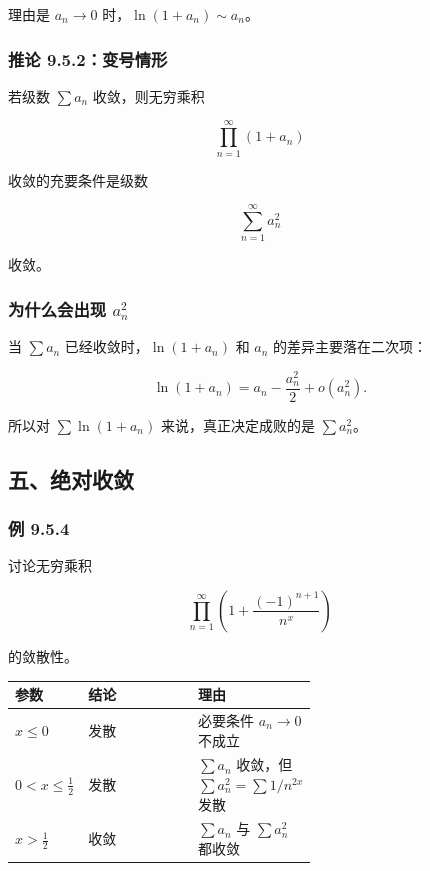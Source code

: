 理由是 \(a_n\to0\) 时，\(\ln(1+a_n)\sim a_n\)。

\subsubsection*{推论 9.5.2：变号情形}

若级数 \(\sum a_n\) 收敛，则无穷乘积

\[
      \prod_{n=1}^{\infty}(1+a_n)
    \]

收敛的充要条件是级数

\[
      \sum_{n=1}^{\infty}a_n^2
    \]

收敛。

\subsubsection*{为什么会出现 \(a_n^2\)}

当 \(\sum a_n\) 已经收敛时，\(\ln(1+a_n)\) 和 \(a_n\) 的差异主要落在二次项：

\[
      \ln(1+a_n)=a_n-\frac{a_n^2}{2}+o(a_n^2).
    \]

所以对 \(\sum \ln(1+a_n)\) 来说，真正决定成败的是 \(\sum a_n^2\)。

\subsection*{五、绝对收敛}

\subsubsection*{例 9.5.4}

讨论无穷乘积

\[
      \prod_{n=1}^{\infty}\left(1+\frac{(-1)^{n+1}}{n^x}\right)
    \]

的敛散性。

\begin{center}
\small
\begin{tabularx}{\linewidth}{|>{\raggedright\arraybackslash}p{0.18\linewidth}|>{\raggedright\arraybackslash}p{0.42\linewidth}|>{\raggedright\arraybackslash}X|}
\hline
\textbf{参数} & \textbf{结论} & \textbf{理由} \\ \hline
\(x\le0\) & 发散 & 必要条件 \(a_n\to0\) 不成立 \\ \hline
\(0<x\le\frac12\) & 发散 & \(\sum a_n\) 收敛，但 \(\sum a_n^2=\sum 1/n^{2x}\) 发散 \\ \hline
\(x>\frac12\) & 收敛 & \(\sum a_n\) 与 \(\sum a_n^2\) 都收敛 \\ \hline
\end{tabularx}
\end{center}


